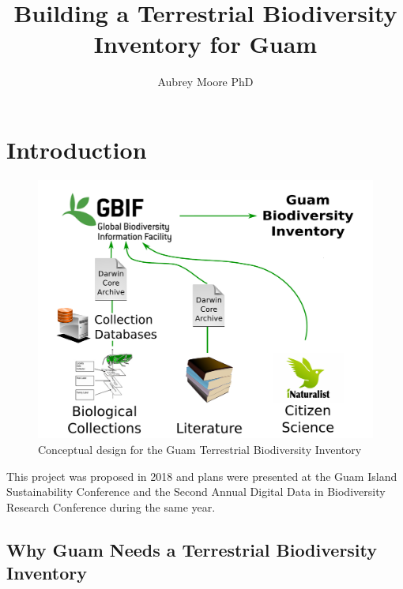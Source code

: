 \documentclass[12pt,letterpaper,english,bibliography=totocnumbered, abstract=on]{scrartcl}
\begin{document}
\titlehead{Final Report: McIntire-Stennis Project XXXX}

\title{Building a Terrestrial Biodiversity Inventory for Guam}

\author{Aubrey Moore PhD}

\maketitle
\newpage
\tableofcontents





\pagebreak
\section{Introduction}
\newrefsection[my.bib]

\begin{figure}[h]
	\includegraphics[width=\linewidth]{images/diag1}
	\caption{Conceptual design for the Guam Terrestrial Biodiversity Inventory}
	\label{fig:diag1}
\end{figure}

This project was proposed in 2018 \cite{moore_mcintire-stennis_2018} and plans were presented at the Guam Island Sustainability Conference \cite{moore_building_2018} and the Second Annual Digital Data in Biodiversity Research Conference \cite{moore_building_2018-1} during the same year.

\subsection{Why Guam Needs a Terrestrial Biodiversity Inventory}
\end{document}
